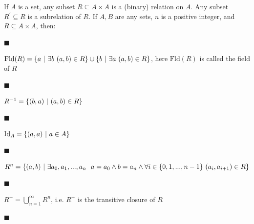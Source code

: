   
 
 
If $A$ is a set, any subset $R\subseteq A\times A$ is a (binary) relation on $A$. Any subset $R^{\prime}\subseteq R$ is a subrelation of $R$. If $A,B$ are any sets, $n$ is a positive integer, and $R\subseteq A\times A$, then:\par
  
\par\noindent  $\blacksquare$ 
 
$\mathrm{Fld}(R)=\{a\leavevmode\nobreak\ |\leavevmode\nobreak\ \exists b%
\leavevmode\nobreak\ (a,b)\in R\}\cup\{b\leavevmode\nobreak\ |\leavevmode%
\nobreak\ \exists a\leavevmode\nobreak\ (a,b)\in R\}$, here $\mathrm{Fld}(R)$ is called the field of $R$\par
 
 
 
\par\noindent  $\blacksquare$ 
 
$R^{-1}=\{(b,a)\leavevmode\nobreak\ |\leavevmode\nobreak\ (a,b)\in R\}$\par
 
 
 
\par\noindent  $\blacksquare$ 
 
$\mathrm{Id}_{A}=\{(a,a)\leavevmode\nobreak\ |\leavevmode\nobreak\ a\in A\}$\par
 
 
 
\par\noindent  $\blacksquare$ 
 
$R^{n}=\{(a,b)\leavevmode\nobreak\ |\leavevmode\nobreak\ \exists a_{0},a_{1},..%
.,a_{n}\leavevmode\nobreak\ \leavevmode\nobreak\ a=a_{0}\wedge b=a_{n}\wedge%
\forall i\in\{0,1,...,n-1\}\leavevmode\nobreak\ (a_{i},a_{i+1})\in R\}$\par
 
 
 
\par\noindent  $\blacksquare$ 
 
$R^{+}=\bigcup_{n=1}^{\infty}R^{n}$, i.e. $R^{+}$ is the transitive closure of $R$\par
 
 
 
\par\noindent  $\blacksquare$ 
 
